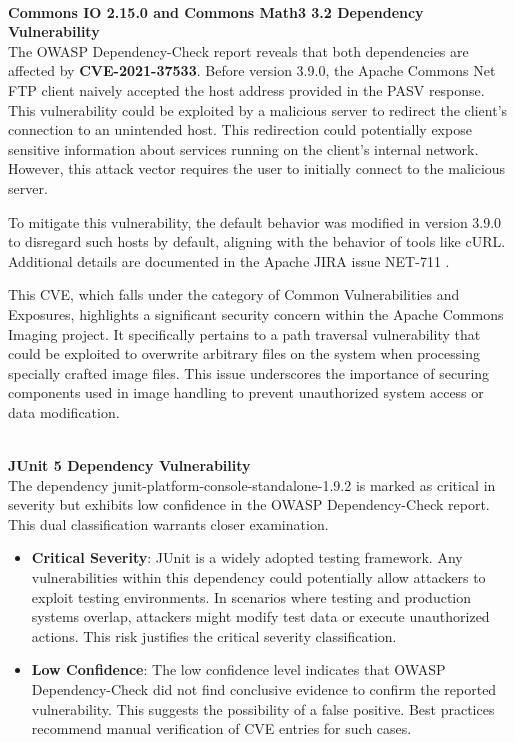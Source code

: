 \documentclass[sigconf]{acmart}
\begin{document}
\hfill\\
{\textbf{Commons IO 2.15.0 and Commons Math3 3.2 Dependency Vulnerability}}
\hfill\\

The OWASP Dependency-Check report reveals that both dependencies are affected by \textbf{CVE-2021-37533}. Before version 3.9.0, the Apache Commons Net FTP client naively accepted the host address provided in the PASV response. This vulnerability could be exploited by a malicious server to redirect the client's connection to an unintended host. This redirection could potentially expose sensitive information about services running on the client's internal network. However, this attack vector requires the user to initially connect to the malicious server\cite{CVE_37}.

To mitigate this vulnerability, the default behavior was modified in version 3.9.0 to disregard such hosts by default, aligning with the behavior of tools like cURL. Additional details are documented in the Apache JIRA issue NET-711 \cite{Java_SE_Specifications}.

This CVE, which falls under the category of Common Vulnerabilities and Exposures, highlights a significant security concern within the Apache Commons Imaging project. It specifically pertains to a path traversal vulnerability that could be exploited to overwrite arbitrary files on the system when processing specially crafted image files. This issue underscores the importance of securing components used in image handling to prevent unauthorized system access or data modification.

\hfill\\
{\textbf{JUnit 5 Dependency Vulnerability}}
\hfill\\

The dependency junit-platform-console-standalone-1.9.2 is marked as critical in severity but exhibits low confidence in the OWASP Dependency-Check report. This dual classification warrants closer examination.

\begin{itemize}
    \item \textbf{Critical Severity}: JUnit is a widely adopted testing framework. Any vulnerabilities within this dependency could potentially allow attackers to exploit testing environments. In scenarios where testing and production systems overlap, attackers might modify test data or execute unauthorized actions. This risk justifies the critical severity classification. 

    \item \textbf{Low Confidence}: The low confidence level indicates that OWASP Dependency-Check did not find conclusive evidence to confirm the reported vulnerability. This suggests the possibility of a false positive. Best practices recommend manual verification of CVE entries for such cases.
\end{itemize}
\end{document}

